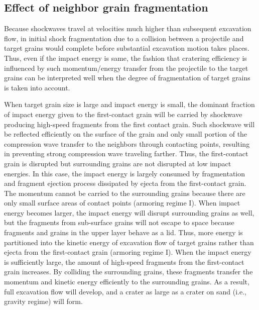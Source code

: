 \documentclass[3p,authoryear]{elsarticle}
\newcommand{\II}{I\hspace{-.1 em}I}
\begin{document}
\subsection{Effect of neighbor grain fragmentation}\label{sec:mechanism}
Because shockwaves travel at velocities much higher than subsequent excavation flow, in initial shock fragmentation due to a collision between a projectile and target grains would complete before substantial excavation motion takes places.
Thus, even if the impact energy is same, the fashion that cratering efficiency is influenced by such momentum/energy transfer from the projectile to the target grains can be interpreted well when the degree of fragmentation of target grains is taken into account.

When target grain size is large and impact energy is small, the dominant fraction of impact energy given to the first-contact grain will be carried by shockwave producing high-speed fragments from the first contact grain.
Such shockwave will be reflected efficiently on the surface of the grain and only small portion of the compression wave transfer to the neighbors through contacting points, resulting in preventing strong compression wave traveling farther.
Thus, the first-contact grain is disrupted but surrounding grains are not disrupted at low impact energies. In this case, the impact energy is largely consumed by fragmentation and fragment ejection process dissipated by ejecta from the first-contact grain.
The momentum cannot be carried to the surrounding grains because there are only small surface areas of contact points (armoring regime I).
When impact energy becomes larger, the impact energy will disrupt surrounding grains as well, but the fragments from sub-surface grains will not escape to space because fragments and grains in the upper layer behave as a lid.
Thus, more energy is partitioned into the kinetic energy of excavation flow of target grains rather than ejecta from the first-contact grain (armoring regime I).
When the impact energy is sufficiently large, the amount of high-speed fragments from the first-contact grain increases.
By colliding the surrounding grains, these fragments transfer the momentum and kinetic energy efficiently to the surrounding grains.
As a result, full excavation flow will develop, and a crater as large as a crater on sand (i.e., gravity regime) will form.
\end{document}
